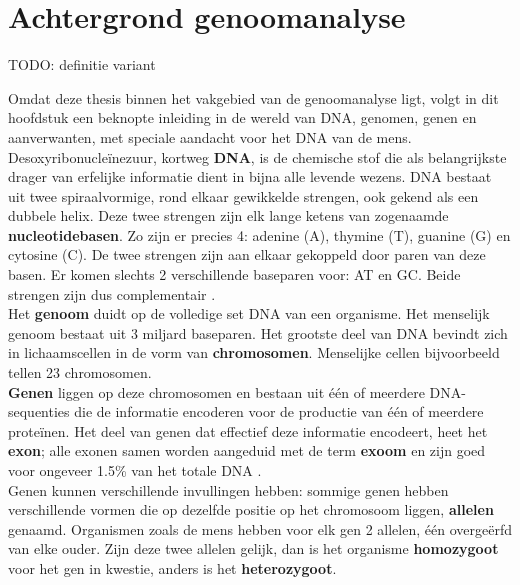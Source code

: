 \chapter{Achtergrond genoomanalyse}
\label{dna_dummies}

{\color{red} TODO: definitie variant}

Omdat deze thesis binnen het vakgebied van de genoomanalyse ligt, volgt in dit hoofdstuk een beknopte inleiding in de wereld van DNA, genomen, genen en aanverwanten, met speciale aandacht voor het DNA van de mens.\\

Desoxyribonucle\"inezuur, kortweg \textbf{DNA}, is de chemische stof die als belangrijkste drager van erfelijke informatie dient in bijna alle levende wezens. DNA bestaat uit twee spiraalvormige, rond elkaar gewikkelde strengen, ook gekend als een dubbele helix. Deze twee strengen zijn elk lange ketens van zogenaamde \textbf{nucleotidebasen}. Zo zijn er precies 4: adenine (A), thymine (T), guanine (G) en cytosine (C). De twee strengen zijn aan elkaar gekoppeld door paren van deze basen. Er komen slechts 2 verschillende baseparen voor: AT en GC. Beide strengen zijn dus complementair \cite{genome_gov} \cite{nature_scitable}.\\

Het \textbf{genoom} duidt op de volledige set DNA van een organisme. Het menselijk genoom bestaat uit 3 miljard baseparen. Het grootste deel van DNA bevindt zich in lichaamscellen in de vorm van \textbf{chromosomen}. Menselijke cellen bijvoorbeeld tellen 23 chromosomen.\\
\textbf{Genen} liggen op deze chromosomen en bestaan uit \'e\'en of meerdere DNA-sequenties die de informatie encoderen voor de productie van \'e\'en of meerdere prote\"inen. Het deel van genen dat effectief deze informatie encodeert, heet het \textbf{exon}; alle exonen samen worden aangeduid met de term \textbf{exoom} en zijn goed voor ongeveer 1.5\% van het totale DNA \cite{broad_exome}.\\
Genen kunnen verschillende invullingen hebben: sommige genen hebben verschillende vormen die op dezelfde positie op het chromosoom liggen, \textbf{allelen} genaamd. Organismen zoals de mens hebben voor elk gen 2 allelen, \'e\'en overge\"erfd van elke ouder. Zijn deze twee allelen gelijk, dan is het organisme \textbf{homozygoot} voor het gen in kwestie, anders is het \textbf{heterozygoot}.

